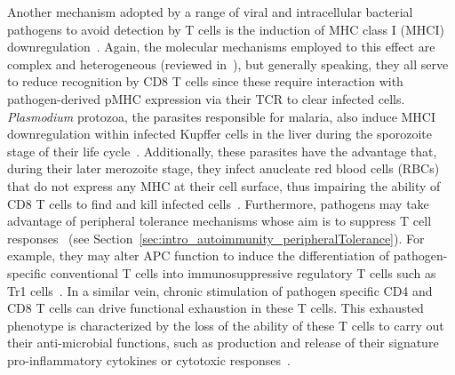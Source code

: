 Another mechanism adopted by a range of viral and intracellular bacterial pathogens to avoid detection by T cells is the induction of MHC class I (MHCI) downregulation~\cite{hewitt2003mhc,shepherd2020t,delannoy2019cat,antoniou2008pathogen}. Again, the molecular mechanisms employed to this effect are complex and heterogeneous (reviewed in~\cite{antoniou2008pathogen}), but generally speaking, they all serve to reduce recognition by CD8\pos{} T cells since these require interaction with pathogen-derived pMHC expression via their TCR to clear infected cells. \textit{Plasmodium} protozoa, the parasites responsible for malaria, also induce MHCI downregulation within infected Kupffer cells in the liver during the sporozoite stage of their life cycle~\cite{steers2005immune,gomes2016immune}. Additionally, these parasites have the advantage that, during their later merozoite stage, they infect anucleate red blood cells (RBCs) that do not express any MHC at their cell surface, thus impairing the ability of CD8\pos{} T cells to find and kill infected cells~\cite{gomes2016immune}. Furthermore, pathogens may take advantage of peripheral tolerance mechanisms whose aim is to suppress T cell responses~\cite{garib2015t} (see Section~\ref{sec:intro_autoimmunity_peripheralTolerance}). For example, they may alter APC function to induce the differentiation of pathogen-specific conventional T cells into immunosuppressive regulatory T cells such as Tr1 cells~\cite{belkaid2007regulatory,belkaid2009regulatory,garib2015t,boer2015regulatory}. In a similar vein, chronic stimulation of pathogen specific CD4\pos{} and CD8\pos{} T cells can drive functional exhaustion in these T cells. This exhausted phenotype is characterized by the loss of the ability of these T cells to carry out their anti-microbial functions, such as production and release of their signature pro-inflammatory cytokines or cytotoxic responses~\cite{zajac1998viral,wherry2011t,shepherd2020t}.


